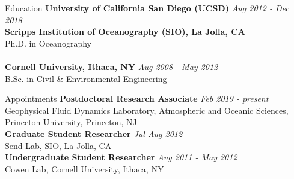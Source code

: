 \documentclass{resume} %
\begin{document}
\begin{rSection}{Education}
{\bf University of California San Diego (UCSD)} \hfill {\em Aug 2012 - Dec 2018}\\
{\bf Scripps Institution of Oceanography (SIO), La Jolla, CA} \\ Ph.D. in Oceanography \\
\\
{\bf Cornell University, Ithaca, NY} \hfill {\em Aug 2008 - May 2012} \\
B.Sc. in Civil \& Environmental Engineering
\end{rSection}

\begin{rSection}{Appointments}
{\bf Postdoctoral Research Associate} \hfill {\em Feb 2019 - present}\\
Geophysical Fluid Dynamics Laboratory, Atmospheric and Oceanic Sciences, Princeton University, Princeton, NJ \\
{\bf Graduate Student Researcher} \hfill {\em Jul-Aug 2012}\\
Send Lab, SIO, La Jolla, CA \\
{\bf Undergraduate Student Researcher} \hfill {\em Aug 2011 - May 2012}\\
Cowen Lab, Cornell University, Ithaca, NY
\end{rSection}

\end{document}
